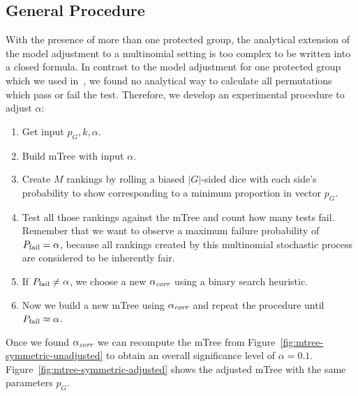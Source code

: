 \subsection{General Procedure}
\label{subsec:general-process}
%
With the presence of more than one protected group, the analytical extension of the model adjustment to a multinomial setting is too complex to be written into a closed formula.
%
In contrast to the model adjustment for one protected group which we used in~\cite{zehlike2017fair},
we found no analytical way to calculate all permutations which pass or fail the test.
%
Therefore, we develop an experimental procedure to adjust $ \alpha $:
%
\begin{enumerate}
	\item Get input $ p_G, k, \alpha $.
	\item Build mTree with input $ \alpha $.
	\item Create $M$ rankings by rolling a biased $ |G| $-sided dice with each side's probability to show corresponding to a minimum proportion in vector $ p_G $.
	\item Test all those rankings against the mTree and count how many tests fail.
	Remember that we want to observe a maximum failure probability of $ P_{\operatorname{fail}}=\alpha $, because all rankings created by this multinomial stochastic process are considered to be inherently fair.
	\item If $ P_{\operatorname{fail}} \neq \alpha $, we choose a new $ \alpha_\textit{corr} $ using a binary search heuristic.
	\item Now we build a new mTree using $ \alpha_\textit{corr} $ and repeat the procedure until $ P_{\operatorname{fail}} \approx \alpha $.
\end{enumerate}
%
Once we found $\alpha_\textit{corr}$ we can recompute the mTree from Figure~\ref{fig:mtree-symmetric-unadjusted} %
 to obtain an overall significance level of $\alpha = 0.1$.
%
Figure~\ref{fig:mtree-symmetric-adjusted}
shows the adjusted mTree with the same parameters $p_G$.


